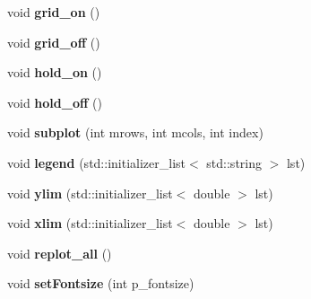 \begin{DoxyCompactItemize}
\item 
\hypertarget{classkeycpp_1_1_figure_a3c036559f8ad56b099ac0b44c652225d}{void {\bfseries grid\-\_\-on} ()}\label{classkeycpp_1_1_figure_a3c036559f8ad56b099ac0b44c652225d}

\item 
\hypertarget{classkeycpp_1_1_figure_a3736e01bc278c2c2b47e4ff046fdda0e}{void {\bfseries grid\-\_\-off} ()}\label{classkeycpp_1_1_figure_a3736e01bc278c2c2b47e4ff046fdda0e}

\item 
\hypertarget{classkeycpp_1_1_figure_a65b80e5b67c7bbf225e3001a538a6dad}{void {\bfseries hold\-\_\-on} ()}\label{classkeycpp_1_1_figure_a65b80e5b67c7bbf225e3001a538a6dad}

\item 
\hypertarget{classkeycpp_1_1_figure_ae5e5ac67e9450ea4fbf06fb3fcc6523a}{void {\bfseries hold\-\_\-off} ()}\label{classkeycpp_1_1_figure_ae5e5ac67e9450ea4fbf06fb3fcc6523a}

\item 
\hypertarget{classkeycpp_1_1_figure_a59b0acbd975579bf8330849f004637fc}{void {\bfseries subplot} (int mrows, int mcols, int index)}\label{classkeycpp_1_1_figure_a59b0acbd975579bf8330849f004637fc}

\item 
\hypertarget{classkeycpp_1_1_figure_a315140182f731518bc1f6f037a12c3a5}{void {\bfseries legend} (std\-::initializer\-\_\-list$<$ std\-::string $>$ lst)}\label{classkeycpp_1_1_figure_a315140182f731518bc1f6f037a12c3a5}

\item 
\hypertarget{classkeycpp_1_1_figure_aa01c44e6509c7075f4f547531c39741b}{void {\bfseries ylim} (std\-::initializer\-\_\-list$<$ double $>$ lst)}\label{classkeycpp_1_1_figure_aa01c44e6509c7075f4f547531c39741b}

\item 
\hypertarget{classkeycpp_1_1_figure_ae779c53eebbee42148324bd8adfd7d01}{void {\bfseries xlim} (std\-::initializer\-\_\-list$<$ double $>$ lst)}\label{classkeycpp_1_1_figure_ae779c53eebbee42148324bd8adfd7d01}

\item 
\hypertarget{classkeycpp_1_1_figure_a47cae082612e5436a6b0bc3d7f27e9d9}{void {\bfseries replot\-\_\-all} ()}\label{classkeycpp_1_1_figure_a47cae082612e5436a6b0bc3d7f27e9d9}

\item 
\hypertarget{classkeycpp_1_1_figure_ab8d777d1b44e242b104350093ef09543}{void {\bfseries set\-Fontsize} (int p\-\_\-fontsize)}\label{classkeycpp_1_1_figure_ab8d777d1b44e242b104350093ef09543}


\end{DoxyCompactItemize}
